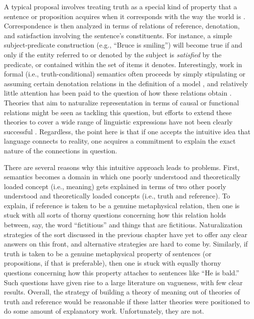 A typical proposal involves treating truth as a special kind of property that a sentence or proposition acquires when it corresponds with the way the world is \citep{Glanzberg:2013}. Correspondence is then analyzed in terms of relations of reference, denotation, and satisfaction involving the sentence's constituents. For instance, a simple subject-predicate construction (e.g., ``Bruce is smiling'') will become true if and only if the entity referred to or denoted by the subject is \textit{satisfied} by the predicate, or contained within the set of items it denotes. Interestingly, work in formal (i.e., truth-conditional) semantics often proceeds by simply stipulating or assuming certain denotation relations in the definition of a model \citep{Carpenter:1997}, and relatively little attention has been paid to the question of how these relations obtain \citep{Stanley:2008}. Theories that aim to naturalize representation in terms of causal or functional relations might be seen as tackling this question, but efforts to extend these theories to cover a wide range of linguistic expressions have not been clearly successful \citep[c.f.][]{Millikan:2005}. Regardless, the point here is that if one accepts the intuitive idea that language connects to reality, one acquires a commitment to explain the exact nature of the connections in question.

There are several reasons why this intuitive approach leads to problems. First, semantics becomes a domain in which one poorly understood and theoretically loaded concept (i.e., meaning) gets explained in terms of two other poorly understood and theoretically loaded concepts (i.e., truth and reference). To explain, if reference is taken to be a genuine metaphysical relation, then one is stuck with all sorts of thorny questions concerning how this relation holds between, say, the word ``fictitious'' and things that are fictitious. Naturalization strategies of the sort discussed in the previous chapter have yet to offer any clear answers on this front, and alternative strategies are hard to come by. Similarly, if truth is taken to be a genuine metaphysical property of sentences (or propositions, if that is preferable), then one is stuck with equally thorny questions concerning how this property attaches to sentences like ``He is bald.'' Such questions have given rise to a large literature on vagueness, with few clear results. Overall, the strategy of building a theory of meaning out of theories of truth and reference would be reasonable if these latter theories were positioned to do some amount of explanatory work. Unfortunately, they are not. 

